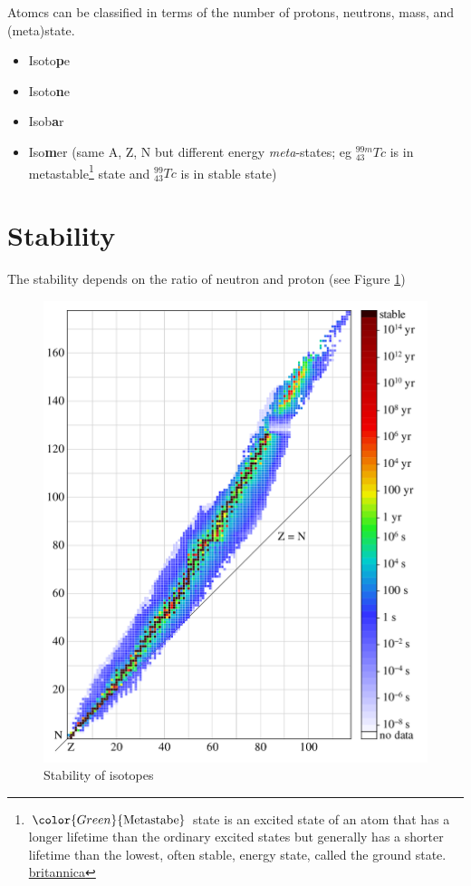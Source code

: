 \documentclass[]{book}
\providecommand{\tightlist}{%
  \setlength{\itemsep}{0pt}\setlength{\parskip}{0pt}}
\let\rmarkdownfootnote\footnote%
\def\footnote{\protect\rmarkdownfootnote}
\theoremstyle{definition}
\theoremstyle{definition}
\theoremstyle{definition}
\theoremstyle{remark}
\begin{document}
Atomcs can be classified in terms of the number of protons, neutrons,
mass, and (meta)state.

\begin{itemize}
\tightlist
\item
  Isoto\textbf{p}e
\item
  Isoto\textbf{n}e
\item
  Isob\textbf{a}r
\item
  Iso\textbf{m}er (same A, Z, N but different energy \emph{meta}-states;
  eg \(_{43}^{99m}Tc\) is in metastable\footnote{\(\color{Green}{\text{Metastabe}}\)
    state is an excited state of an atom that has a longer lifetime than
    the ordinary excited states but generally has a shorter lifetime
    than the lowest, often stable, energy state, called the ground
    state.
    \href{https://www.britannica.com/science/metastable-state}{britannica}}
  state and \(^{99}_{43}Tc\) is in stable state)
\end{itemize}

\section{Stability}\label{stability}

The stability depends on the ratio of neutron and proton (see Figure
\ref{fig:halflife})

\begin{figure}

{\centering \includegraphics[width=0.8\linewidth]{figures/isotope_halflife} 

}

\caption{Stability of isotopes}\label{fig:halflife}
\end{figure}
\end{document}
